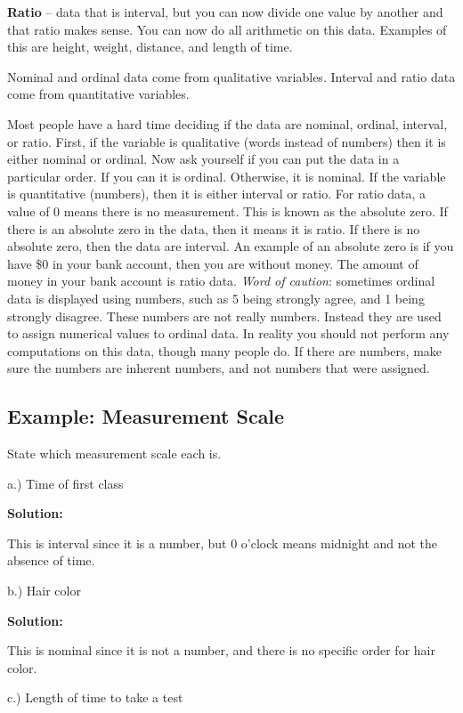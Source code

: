 \documentclass[
]{book}
\begin{document}
\textbf{Ratio} -- data that is interval, but you can now divide one value by another and that ratio makes sense. You can now do all arithmetic on this data. Examples of this are height, weight, distance, and length of time.

Nominal and ordinal data come from qualitative variables. Interval and ratio data come from quantitative variables.

Most people have a hard time deciding if the data are nominal, ordinal, interval, or ratio. First, if the variable is qualitative (words instead of numbers) then it is either nominal or ordinal. Now ask yourself if you can put the data in a particular order. If you can it is ordinal. Otherwise, it is nominal. If the variable is quantitative (numbers), then it is either interval or ratio. For ratio data, a value of 0 means there is no measurement. This is known as the absolute zero. If there is an absolute zero in the data, then it means it is ratio. If there is no absolute zero, then the data are interval. An example of an absolute zero is if you have \$0 in your bank account, then you are without money. The amount of money in your bank account is ratio data. \emph{Word of caution}: sometimes ordinal data is displayed using numbers, such as 5 being strongly agree, and 1 being strongly disagree. These numbers are not really numbers. Instead they are used to assign numerical values to ordinal data. In reality you should not perform any computations on this data, though many people do. If there are numbers, make sure the numbers are inherent numbers, and not numbers that were assigned.

\hypertarget{example-measurement-scale}{%
\subsection{Example: Measurement Scale}\label{example-measurement-scale}}

State which measurement scale each is.

a.) Time of first class

\textbf{Solution:}

This is interval since it is a number, but 0 o'clock means midnight and not the absence of time.

b.) Hair color

\textbf{Solution:}

This is nominal since it is not a number, and there is no specific order for hair color.

c.) Length of time to take a test
\end{document}
